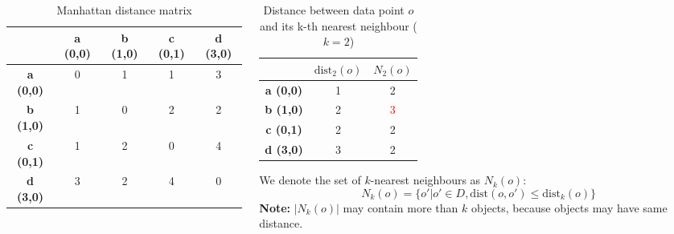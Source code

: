 \documentclass[aspectratio=169, 10pt]{beamer}
\begin{document}
\begin{frame}
\begin{columns}[t]
\begin{column}{0.5\textwidth}
            \begin{table}[]
                \scriptsize
                \begin{tabular}{c|cccc}
                             & \textbf{a (0,0)} & \textbf{b (1,0)} & \textbf{c (0,1)} & \textbf{d (3,0)} \\ \hline
                \textbf{a (0,0)} & 0            & 1            & 1            & 3            \\
                \textbf{b (1,0)} & 1            & 0            & 2            & 2            \\
                \textbf{c (0,1)} & 1            & 2            & 0            & 4            \\
                \textbf{d (3,0)} & 3            & 2            & 4            & 0           
                \end{tabular}
                \caption{Manhattan distance matrix}
            \end{table}
        \end{column}
        \begin{column}{0.5\textwidth}
            \begin{table}[]
                \scriptsize
                \begin{tabular}{c|cc}
                             & $\text{dist}_2(o)$ & $N_2(o)$ \\ \hline
                \textbf{a (0,0)} & 1 & 2 \\
                \textbf{b (1,0)} & 2 & \textcolor{red}{3} \\
                \textbf{c (0,1)} & 2 & 2 \\
                \textbf{d (3,0)} & 3 & 2  
                \end{tabular}
                \caption{Distance between data point $o$ and its k-th nearest neighbour ($k=2$)}
            \end{table}
            We denote the set of $k$-nearest neighbours as $N_k(o)$:
            \[
                N_k(o) = \{o' | o' \in D, \text{dist}(o, o') \le \text{dist}_k(o)\}
            \]
            \textbf{Note:} $|N_k(o)|$ may contain more than $k$ objects, because objects may have same distance.
        \end{column}
    \end{columns}

\end{frame}
\end{document}
